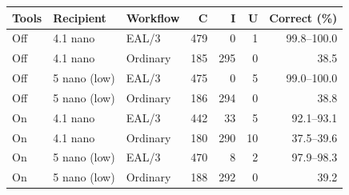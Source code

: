 \begin{tabular}{@{}lllrrrr@{}}\toprule
Tools & Recipient & Workflow & C & I & U & Correct (\%)\\\midrule
Off & 4.1 nano & EAL/3 & 479 & 0 & 1 & 99.8--100.0 \\
Off & 4.1 nano & Ordinary & 185 & 295 & 0 & 38.5 \\
Off & 5 nano (low) & EAL/3 & 475 & 0 & 5 & 99.0--100.0 \\
Off & 5 nano (low) & Ordinary & 186 & 294 & 0 & 38.8 \\
On & 4.1 nano & EAL/3 & 442 & 33 & 5 & 92.1--93.1 \\
On & 4.1 nano & Ordinary & 180 & 290 & 10 & 37.5--39.6 \\
On & 5 nano (low) & EAL/3 & 470 & 8 & 2 & 97.9--98.3 \\
On & 5 nano (low) & Ordinary & 188 & 292 & 0 & 39.2 \\
\bottomrule\end{tabular}
